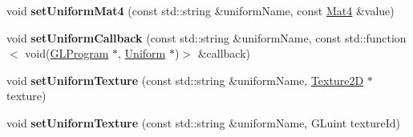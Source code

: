 \begin{DoxyCompactItemize}
\item 
\mbox{\label{classGLProgramState_ab6866f8be98c5689ab449fa1d8d63abf}} 
void {\bfseries set\+Uniform\+Mat4} (const std\+::string \&uniform\+Name, const \hyperlink{classMat4}{Mat4} \&value)
\item 
\mbox{\label{classGLProgramState_ab68ab4203f7d3c72daeeef21cd677abc}} 
void {\bfseries set\+Uniform\+Callback} (const std\+::string \&uniform\+Name, const std\+::function$<$ void(\hyperlink{classGLProgram}{G\+L\+Program} $\ast$, \hyperlink{structUniform}{Uniform} $\ast$)$>$ \&callback)
\item 
\mbox{\label{classGLProgramState_ab5dd4c017912c8207bd2d9a087c27c5d}} 
void {\bfseries set\+Uniform\+Texture} (const std\+::string \&uniform\+Name, \hyperlink{classTexture2D}{Texture2D} $\ast$texture)
\item 
\mbox{\label{classGLProgramState_a6ca446c128355f68a77b7c1883ea704b}} 
void {\bfseries set\+Uniform\+Texture} (const std\+::string \&uniform\+Name, G\+Luint texture\+Id)
\end{DoxyCompactItemize}

